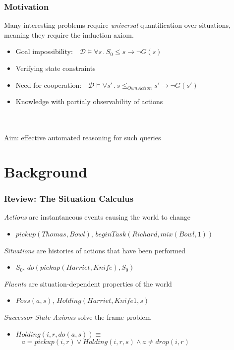 \documentclass[compress]{beamer}
\begin{document}
\begin{frame}
\frametitle{Motivation}
Many interesting problems require \emph{universal} quantification over
situations, meaning they require the induction axiom.
\begin{itemize}
  \item Goal impossibility: $\,\,\,\,\mathcal{D} \models \forall s\,.\,S_0 \leq s \rightarrow \neg G(s)$
  \item Verifying state constraints
  \item Need for cooperation: $\,\,\,\,\mathcal{D} \models \forall s'\,.\,s \leq_{OwnAction} s' \rightarrow \neg G(s')$
  \item Knowledge with partialy observability of actions
\end{itemize}
\ \\
\ \\
Aim: effective automated reasoning for such queries
\end{frame}

\section{Background}

\begin{frame}
\frametitle{Review: The Situation Calculus}
\emph{Actions} are instantaneous events causing the world to change
\begin{itemize}
  \item $pickup(Thomas,Bowl)$, $beginTask(Richard,mix(Bowl,1))$
\end{itemize}
\emph{Situations} are histories of actions that have been performed
\begin{itemize}
  \item $S_0$, $do(pickup(Harriet,Knife),S_0)$
\end{itemize}
\emph{Fluents} are situation-dependent properties of the world
\begin{itemize}
  \item $Poss(a,s)$, $Holding(Harriet,Knife1,s)$
\end{itemize}
\emph{Successor State Axioms} solve the frame problem
\begin{itemize}
  \item $Holding(i,r,do(a,s)) \equiv$ \\ $\,\,\,\,\,a=pickup(i,r) \vee Holding(i,r,s) \wedge a\neq drop(i,r)$
\end{itemize}
\ \\
\end{frame}
\end{document}
